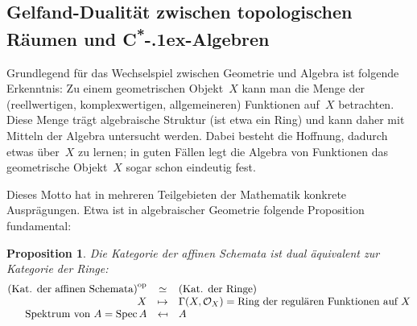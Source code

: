 \documentclass[a4paper,ngerman,12pt]{scrartcl}
\theoremstyle{definition}
\theoremstyle{plain}
\newtheorem{prop}[defn]{Proposition}
\theoremstyle{remark}
\renewcommand{\O}{\mathcal{O}}
\newcommand{\csalgebren}{C\textsuperscript{*}\kern-.1ex-Alge\-bren}
\DeclareMathOperator{\Spec}{Spec}
\newcommand{\op}{\mathrm{op}}
\renewcommand{\_}{\mathpunct{.}\,}
\newcommand{\?}{\,{:}\,}
\begin{document}
\subsection{Gelfand-Dualität zwischen topologischen Räumen und \csalgebren}

Grundlegend für das Wechselspiel zwischen Geometrie und Algebra ist folgende
Erkenntnis: Zu einem geometrischen Objekt~$X$ kann man die Menge der
(reellwertigen, komplexwertigen, allgemeineren) Funktionen auf~$X$ betrachten.
Diese Menge trägt algebraische Struktur (ist etwa ein Ring) und kann daher mit
Mitteln der Algebra untersucht werden. Dabei besteht die Hoffnung, dadurch
etwas über~$X$ zu lernen; in guten Fällen legt die Algebra von Funktionen
das geometrische Objekt~$X$ sogar schon eindeutig fest.

Dieses Motto hat in mehreren Teilgebieten der Mathematik konkrete Ausprägungen.
Etwa ist in algebraischer Geometrie folgende Proposition fundamental:
\begin{prop}Die Kategorie der affinen Schemata ist dual äquivalent zur Kategorie der
Ringe:
\[ \begin{array}{@{}rcl@{}}
  \textnormal{(Kat. der affinen Schemata)}^\op &\simeq& \textnormal{(Kat. der Ringe)} \\
  X &\mapsto& \Gamma(X, \O_X) = \textnormal{Ring der regulären Funktionen auf~$X$} \\
  \textnormal{Spektrum von~$A$} = \Spec A &\mapsfrom& A
\end{array} \]
\end{prop}
\end{document}
